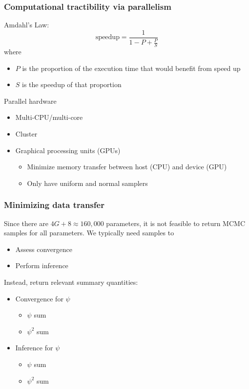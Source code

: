 \documentclass[handout]{beamer}\usepackage[]{graphicx}\usepackage[]{color}
\begin{document}
\begin{frame}
\frametitle{Computational tractibility via parallelism}

Amdahl's Law:
\[
\mbox{speedup} = \frac{1}{1-P+\frac{P}{S}}
\]
\pause
where
\begin{itemize}
\item $P$ is the proportion of the execution time that would benefit from speed up
\item $S$ is the speedup of that proportion
\end{itemize}

\vspace{0.2in} \pause

Parallel hardware
\begin{itemize}[<+->]
\item Multi-CPU/multi-core
\item Cluster
\item Graphical processing units (GPUs)
\begin{itemize}
\item Minimize memory transfer between host (CPU) and device (GPU)
\item Only have uniform and normal samplers
\end{itemize}
\end{itemize}
\end{frame}


\begin{frame}
\frametitle{Minimizing data transfer}

Since there are $4G+8\approx 160,000$ parameters, it is not feasible to return MCMC samples for all parameters. \pause We typically need samples to 
\begin{itemize}
\item Assess convergence
\item Perform inference
\end{itemize}

\vspace{0.2in} \pause

Instead, return relevant summary quantities:
\begin{itemize}
\item Convergence for $\psi$
  \begin{itemize}
  \item $\psi$ sum
  \item $\psi^2$ sum 
  \end{itemize}
\item Inference for $\psi$
  \begin{itemize}
  \item $\psi$ sum
  \item $\psi^2$ sum 
  \end{itemize}
\end{itemize}
\end{frame}
\end{document}
